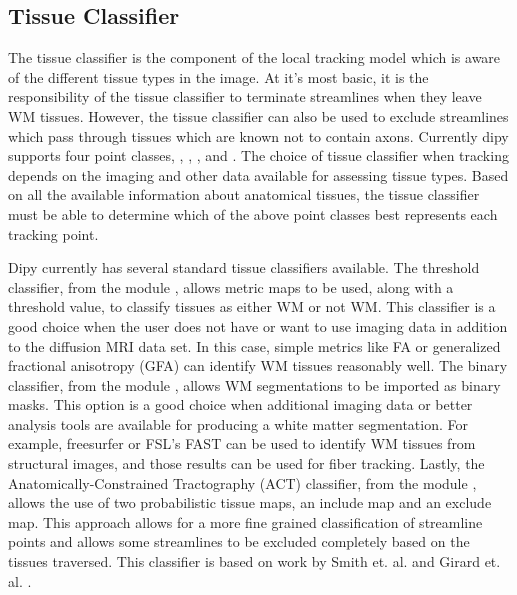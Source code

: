 \subsection{Tissue Classifier}
    The tissue classifier is the component of the local tracking model which is aware of the different tissue types in the image. At it's most basic, it is the responsibility of the tissue classifier to terminate streamlines when they leave WM tissues. However, the tissue classifier can also be used to exclude streamlines which pass through tissues which are known not to contain axons. Currently dipy supports four point classes, , , , and . The choice of tissue classifier when tracking depends on the imaging and other data available for assessing tissue types. Based on all the available information about anatomical tissues, the tissue classifier must be able to determine which of the above point classes best represents each tracking point.
    
    Dipy currently has several standard tissue classifiers available. The threshold classifier,  from the module , allows metric maps to be used, along with a threshold value, to classify tissues as either WM or not WM. This classifier is a good choice when the user does not have or want to use imaging data in addition to the diffusion MRI data set. In this case, simple metrics like FA or generalized fractional anisotropy (GFA) can identify WM tissues reasonably well. The binary classifier,  from the module , allows WM segmentations to be imported as binary masks. This option is a good choice when additional imaging data or better analysis tools are available for producing a white matter segmentation. For example, freesurfer \cite{Dale_1999} or FSL's FAST \cite{Zhang_2001} can be used to identify WM tissues from structural images, and those results can be used for fiber tracking. Lastly, the Anatomically-Constrained Tractography (ACT) classifier,  from the module , allows the use of two probabilistic tissue maps, an include map and an exclude map. This approach allows for a more fine grained classification of streamline points and allows some streamlines to be excluded completely based on the tissues traversed. This classifier is based on work by Smith et. al. \cite{Smith_2012} and Girard et. al. \cite{girard2014towards}.
    
